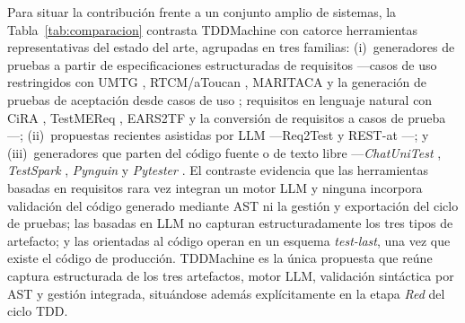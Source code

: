 \documentclass[10pt,journal,twoside,letterpaper]{IEEEtran}
\begin{document}
    Para situar la contribución frente a un conjunto amplio de sistemas, la Tabla~\ref{tab:comparacion} contrasta TDDMachine con catorce herramientas representativas del estado del arte, agrupadas en tres familias: (i)~generadores de pruebas a partir de especificaciones estructuradas de requisitos ---casos de uso restringidos con UMTG \cite{Wang2015Umtg}, RTCM/aToucan \cite{Yue2015Rtcm}, MARITACA \cite{Erazo2017Maritaca} y la generación de pruebas de aceptación desde casos de uso \cite{Wang2022Automatic}; requisitos en lenguaje natural con CiRA \cite{Frattini2023Cira}, TestMEReq \cite{Moketar2016Testmereq}, EARS2TF \cite{Liu2022Ears2tf} y la conversión de requisitos a casos de prueba \cite{Gupta2019Software}---; (ii)~propuestas recientes asistidas por LLM ---Req2Test \cite{Franca2026Req2test} y REST-at \cite{LeonQuinstedt2026Rest}---; y (iii)~generadores que parten del código fuente o de texto libre ---\emph{ChatUniTest} \cite{chen2024chatunitest}, \emph{TestSpark} \cite{sapozhnikov2024testspark}, \emph{Pynguin} \cite{lukasczyk2022pynguin} y \emph{Pytester} \cite{takerngsaksiri2025pytester}. El contraste evidencia que las herramientas basadas en requisitos rara vez integran un motor LLM y ninguna incorpora validación del código generado mediante AST ni la gestión y exportación del ciclo de pruebas; las basadas en LLM no capturan estructuradamente los tres tipos de artefacto; y las orientadas al código operan en un esquema \emph{test-last}, una vez que existe el código de producción. TDDMachine es la única propuesta que reúne captura estructurada de los tres artefactos, motor LLM, validación sintáctica por AST y gestión integrada, situándose además explícitamente en la etapa \emph{Red} del ciclo TDD.
    
\end{document}
